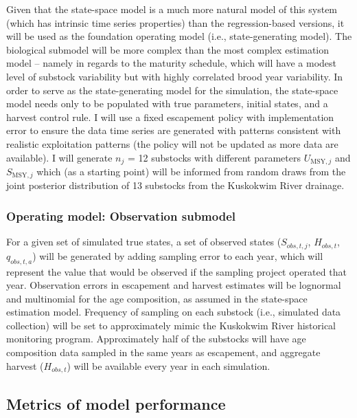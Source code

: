 \documentclass[12pt,]{book}
\theoremstyle{definition}
\theoremstyle{definition}
\theoremstyle{definition}
\theoremstyle{remark}
\begin{document}
Given that the state-space model is a much more natural model of this
system (which has intrinsic time series properties) than the
regression-based versions, it will be used as the foundation operating
model (i.e., state-generating model). The biological submodel will be
more complex than the most complex estimation model -- namely in regards
to the maturity schedule, which will have a modest level of substock
variability but with highly correlated brood year variability. In order
to serve as the state-generating model for the simulation, the
state-space model needs only to be populated with true parameters,
initial states, and a harvest control rule. I will use a fixed
escapement policy with implementation error to ensure the data time
series are generated with patterns consistent with realistic
exploitation patterns (the policy will not be updated as more data are
available). I will generate \(n_j\) = 12 substocks with different
parameters \(U_{\text{MSY},j}\) and \(S_{\text{MSY},j}\) which (as a
starting point) will be informed from random draws from the joint
posterior distribution of 13 substocks from the Kuskokwim River
drainage.

\subsubsection{Operating model: Observation
submodel}\label{operating-model-observation-submodel}

For a given set of simulated true states, a set of observed states
(\(S_{obs,t,j}\), \(H_{obs,t}\), \(q_{obs,t,a}\)) will be generated by
adding sampling error to each year, which will represent the value that
would be observed if the sampling project operated that year.
Observation errors in escapement and harvest estimates will be lognormal
and multinomial for the age composition, as assumed in the state-space
estimation model. Frequency of sampling on each substock (i.e.,
simulated data collection) will be set to approximately mimic the
Kuskokwim River historical monitoring program. Approximately half of the
substocks will have age composition data sampled in the same years as
escapement, and aggregate harvest (\(H_{obs,t}\)) will be available
every year in each simulation.

\subsection{Metrics of model
performance}\label{metrics-of-model-performance}
\end{document}
